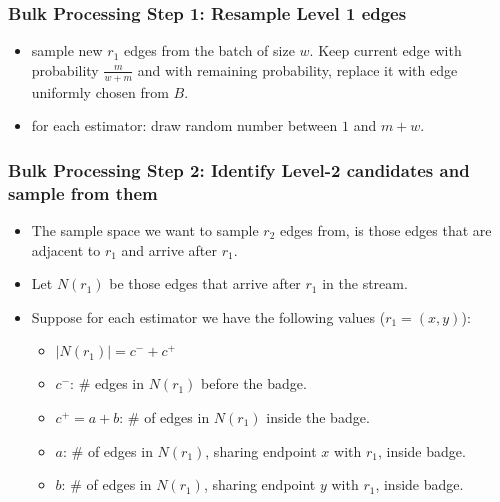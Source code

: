 \documentclass[11pt]{beamer}
\begin{document}
\begin{frame}
\frametitle{Bulk Processing Step 1: Resample Level 1 edges}
\begin{itemize}
\item sample new $r_1$ edges from the batch of size $w$. Keep current edge with probability $\frac{m}{w+m}$ and with remaining probability, replace it with edge uniformly chosen from $B$.
\item for each estimator: draw random number between $1$ and $m+w$.
\begin{center}
\end{center}
\end{itemize}
\end{frame}

\begin{frame}
\frametitle{Bulk Processing Step 2: Identify Level-2 candidates and sample from them}
\begin{itemize}
\item The sample space we want to sample $r_2$ edges from, is those edges that are adjacent to $r_1$ and arrive after $r_1$.
\item Let $N(r_1)$ be those edges that arrive after $r_1$ in the stream.
\item Suppose for each estimator we have the following values ($r_1=(x,y)$):
\begin{itemize}
\item $\vert N(r_1)\vert=c^-+c^+$
\item $c^-$: $\#$ edges in $N(r_1)$ before the badge.
\item $c^+=a+b$:  $\#$ of edges in $N(r_1)$ inside the badge.
\item $a$: $\#$ of edges in $N(r_1)$, sharing endpoint $x$ with $r_1$, inside badge.
\item $b$: $\#$ of edges in $N(r_1)$, sharing endpoint $y$ with $r_1$, inside badge.
\end{itemize}
\end{itemize}
\end{frame}
\end{document}
